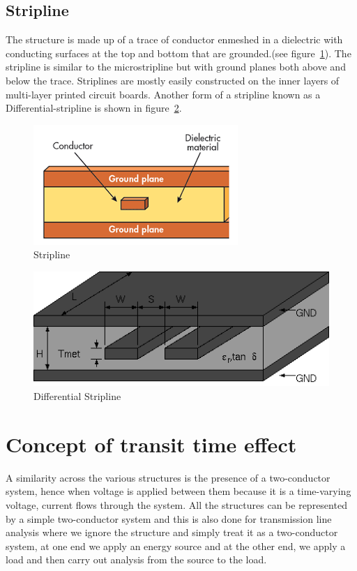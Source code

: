 \subsection{Stripline} 
The structure is made up of a trace of conductor enmeshed in a dielectric with conducting surfaces at the top and bottom that are grounded.(see figure~\ref{fig:stripline}). The stripline is similar to the microstripline but with ground planes both above and below the trace. Striplines are mostly easily constructed on the inner layers of multi-layer printed circuit boards. Another form of a stripline known as a Differential-stripline is shown in figure~\ref{fig:diff-stripline}.
\begin{figure}[h]
\centering
\includegraphics[scale=0.6]{graphics/micro}
\caption{Stripline}
\label{fig:stripline}
\end{figure}

\begin{figure}[h]
\centering
\includegraphics[width=1\linewidth]{graphics/stripline}
\caption{Differential Stripline}
\label{fig:diff-stripline}
\end{figure}

\section{Concept of transit time effect}
A similarity across the various structures is the presence of a two-conductor system, hence when voltage is applied between them because it is a time-varying voltage, current flows through the system. All the structures can be represented by a simple two-conductor system and this is also done for transmission line analysis where we ignore the structure and simply treat it as a two-conductor system, at one end we apply an energy source and at the other end, we apply a load and then carry out analysis from the source to the load.

